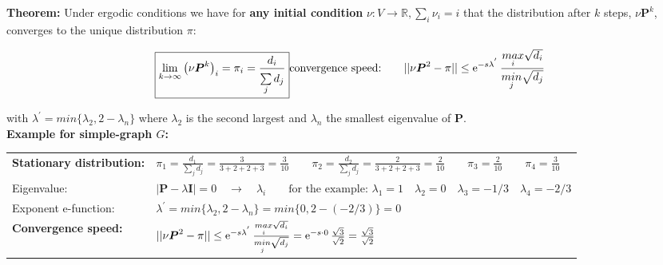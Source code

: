 \textbf{Theorem: } Under ergodic conditions we have for \textbf{any initial condition} $\nu: V \rightarrow \mathbb{R}, \sum\limits_{i}^{}{\nu_i=i}$ that the distribution after $k$ steps, $\nu\bm{P}^k$, converges to the unique distribution $\pi$:

\begin{equation}
	\boxed{\lim\limits_{k \rightarrow \infty}{\big(\nu\boldsymbol{P}^k\big)_i}=\pi_i=\frac{d_i}{\sum\limits_{j}^{}{d_j}}}\\
	\text{convergence speed:\qquad} ||\nu\boldsymbol{P}^2-\pi || \leq \operatorname{\mathrm e}^{-s\lambda^{'}}\frac{\underset{i}{max}\sqrt{d_i}}{\underset{j}{min}\sqrt{d_j}}\nonumber\\
\end{equation}

with $\lambda^{'}=min\{\lambda_2,2-\lambda_n\}$ where $\lambda_2$ is the second largest and $\lambda_n$ the smallest eigenvalue of $\bm{P}$.\\

\textbf{Example for simple-graph $G$: } 

\renewcommand{\arraystretch}{2.0}
\begin{tabular}{ll}
\textbf{Stationary distribution: }& $\pi_1=\frac{d_1}{\sum\limits_j{d_j}}=\frac{3}{3+2+2+3}=\frac 3 {10} \qquad \pi_2=\frac{d_2}{\sum\limits_j{d_j}}=\frac{2}{3+2+2+3}=\frac 2 {10}  \qquad \pi_3=\frac 2 {10}  \qquad \pi_4=\frac 3 {10}$\\
Eigenvalue: & $|\bm{P}-\lambda\bm{I}|=0\quad \rightarrow \quad \lambda_i\qquad \text{for the example: }\lambda_1=1\quad\lambda_2=0\quad\lambda_3=-1/3\quad\lambda_4=-2/3$\\
Exponent e-function: & $\lambda^{'}=min\{\lambda_2,2-\lambda_n\}=min\{0,2-(-2/3)\}=0$\\
\textbf{Convergence speed: }& $||\nu\boldsymbol{P}^2-\pi || \leq \operatorname{\mathrm e}^{-s\lambda^{'}}\frac{\underset{i}{max}\sqrt{d_i}}{\underset{j}{min}\sqrt{d_j}}=\operatorname{\mathrm e}^{-s\cdot 0} \frac{\sqrt{3}}{\sqrt{2}}=\frac{\sqrt{3}}{\sqrt{2}}$
\end{tabular}
\renewcommand{\arraystretch}{1.0}












